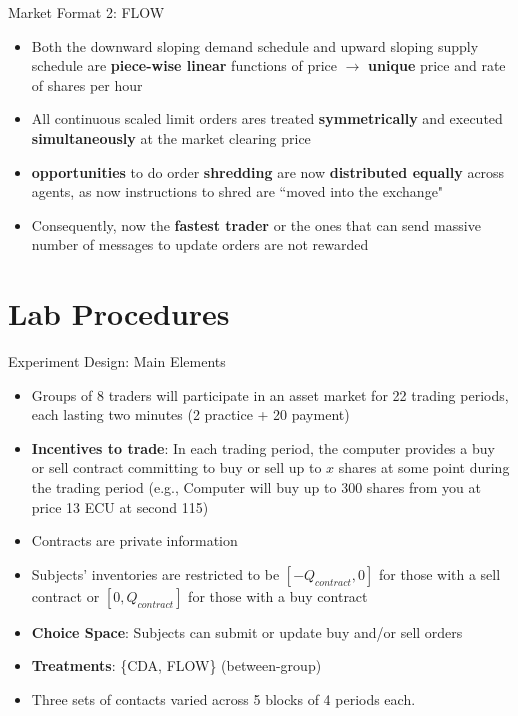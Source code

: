 \documentclass[10pt]{beamer}
\begin{document}
\begin{frame}{Market Format 2: FLOW}
    \begin{itemize}
        \item Both the downward sloping demand schedule and upward sloping supply schedule are \textbf{piece-wise linear} functions of price $\rightarrow$ \textbf{unique} price and rate of shares per hour
        \item All continuous scaled limit orders ares treated \textbf{symmetrically} and executed \textbf{simultaneously} at the market clearing price
        \item \textbf{opportunities} to do order \textbf{shredding} are now \textbf{distributed equally} across agents, as now instructions to shred are ``moved into the exchange"
        \item Consequently, now the \textbf{fastest trader} or the ones that can send massive number of messages to update orders are not rewarded
    \end{itemize}
\end{frame}

\section{Lab Procedures}

\begin{frame}{Experiment Design: Main Elements}
    \begin{itemize}
        \item Groups of 8 traders will participate in an asset market for 22 trading periods, each lasting two minutes (2 practice + 20 payment)
        \item \textbf{Incentives to trade}: In each trading period, the computer provides a buy or sell contract committing to buy or sell up to $x$ shares at some point during the trading period (e.g., Computer will buy up to 300 shares from you at price 13 ECU at second 115)
        \item Contracts are private information
        \item Subjects' inventories are restricted to be $[-Q_{contract}, 0]$ for those with a sell contract or $[0, Q_{contract}]$ for those with a buy contract
        \item \textbf{Choice Space}: Subjects can submit or update buy and/or sell orders
        \item \textbf{Treatments}: \{CDA, FLOW\} (between-group)
        \item Three sets of contacts varied across 5 blocks of 4 periods each. 
    \end{itemize}
\end{frame}
\end{document}
